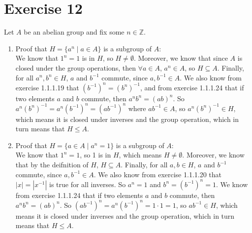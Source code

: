 \documentclass{article}
\newcommand{\Z}{\mathbb{Z}}
\begin{document}
    \section*{Exercise 12}
    Let $A$ be an abelian group and fix some $n \in \Z$. \\
    \begin{enumerate}[label=\textbf{\alph*.}]
        \item 
            Proof that $H = \{a^n \mid a \in A\}$ is a subgroup of $A$: \\
            We know that $1^n = 1$ is in $H$, so $H \neq \emptyset$.
            Moreover, we know that since $A$ is closed under
            the group operations,
            then $\forall a \in A$, $a^n \in A$,
            so $H \subseteq A$.
            Finally, for all $a^n, b^n \in H$, $a$ and $b^{-1}$ commute,
            since $a, b^{-1} \in A$.
            We also know from exercise 1.1.1.19
            that $(b^{-1})^n = (b^n)^{-1}$,
            and from exercise 1.1.1.24 that if two elements $a$ and $b$
            commute, then $a^nb^n = (ab)^n$.
            So $a^n(b^n)^{-1} = a^n(b^{-1})^n = (ab^{-1})^n$
            where $ab^{-1} \in A$,
            so $a^n(b^n)^{-1} \in H$,
            which means it is closed under inverses and the group operation,
            which in turn means that $H \leqslant A$.
        \item
            Proof that $H = \{a \in A \mid a^n = 1\}$ is a subgroup of $A$: \\
            We know that $1^n = 1$, so 1 is in $H$,
            which means $H \neq \emptyset$.
            Moreover, we know that by the deifnition of $H$,
            $H \subseteq A$.
            Finally, for all $a, b \in H$, $a$ and $b^{-1}$ commute,
            since $a, b^{-1} \in A$.
            We also know from exercise 1.1.1.20 that $|x| = |x^{-1}|$
            is true for all inverses.
            So $a^n = 1$ and $b^n = (b^{-1})^n = 1$.
            We know from exercise 1.1.1.24 that if two elements $a$ and $b$
            commute, then $a^nb^n = (ab)^n$.
            So $(ab^{-1})^n = a^n(b^{-1})^n = 1 \cdot 1 = 1$,
            so $ab^{-1} \in H$,
            which means it is closed under inverses and the group operation,
            which in turn means that $H \leqslant A$.
    \end{enumerate}
\end{document}
